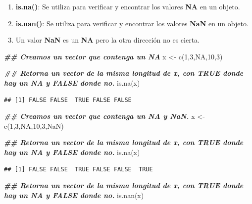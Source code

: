\documentclass[
  12pt,
]{book}
\newenvironment{Shaded}{\begin{snugshade}}{\end{snugshade}}
\newcommand{\ConstantTok}[1]{\textcolor[rgb]{0.00,0.00,0.00}{#1}}
\newcommand{\DecValTok}[1]{\textcolor[rgb]{0.00,0.00,0.81}{#1}}
\newcommand{\DocumentationTok}[1]{\textcolor[rgb]{0.56,0.35,0.01}{\textbf{\textit{#1}}}}
\newcommand{\FunctionTok}[1]{\textcolor[rgb]{0.00,0.00,0.00}{#1}}
\newcommand{\NormalTok}[1]{#1}
\newcommand{\OtherTok}[1]{\textcolor[rgb]{0.56,0.35,0.01}{#1}}
\begin{document}
\begin{enumerate}
\def\labelenumi{\arabic{enumi}.}
\item
  \textbf{is.na()}: Se utiliza para verificar y encontrar los valores \textbf{NA} en un objeto.
\item
  \textbf{is.nan()}: Se utiliza para verificar y encontrar los valores \textbf{NaN} en un objeto.
\item
  Un valor \textbf{NaN} es un \textbf{NA} pero la otra dirección no es cierta.
\end{enumerate}

\begin{Shaded}
\begin{Highlighting}[]
\DocumentationTok{\#\# Creamos un vector que contenga un NA}
\NormalTok{x }\OtherTok{\textless{}{-}} \FunctionTok{c}\NormalTok{(}\DecValTok{1}\NormalTok{,}\DecValTok{3}\NormalTok{,}\ConstantTok{NA}\NormalTok{,}\DecValTok{10}\NormalTok{,}\DecValTok{3}\NormalTok{)}

\DocumentationTok{\#\# Retorna un vector de la misma longitud de x, con TRUE donde hay un NA y FALSE donde no.}
\FunctionTok{is.na}\NormalTok{(x)}
\end{Highlighting}
\end{Shaded}

\begin{verbatim}
## [1] FALSE FALSE  TRUE FALSE FALSE
\end{verbatim}

\begin{Shaded}
\begin{Highlighting}[]
\DocumentationTok{\#\# Creamos un vector que contenga un NA y NaN.}
\NormalTok{x }\OtherTok{\textless{}{-}} \FunctionTok{c}\NormalTok{(}\DecValTok{1}\NormalTok{,}\DecValTok{3}\NormalTok{,}\ConstantTok{NA}\NormalTok{,}\DecValTok{10}\NormalTok{,}\DecValTok{3}\NormalTok{,}\ConstantTok{NaN}\NormalTok{)}

\DocumentationTok{\#\# Retorna un vector de la misma longitud de x, con TRUE donde hay un NA y FALSE donde no.}
\FunctionTok{is.na}\NormalTok{(x)}
\end{Highlighting}
\end{Shaded}

\begin{verbatim}
## [1] FALSE FALSE  TRUE FALSE FALSE  TRUE
\end{verbatim}

\begin{Shaded}
\begin{Highlighting}[]
\DocumentationTok{\#\# Retorna un vector de la misma longitud de x, con TRUE donde hay un NA y FALSE donde no.}
\FunctionTok{is.nan}\NormalTok{(x)}
\end{Highlighting}
\end{Shaded}
\end{document}
